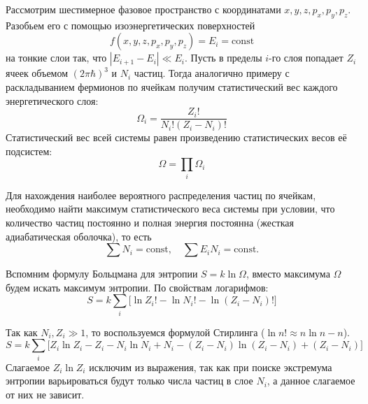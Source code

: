 Рассмотрим шестимерное фазовое пространство с координатами $x,y,z,p_x,p_y,p_z$. Разобьем его с помощью изоэнергетических поверхностей
\begin{equation*}
	f(x,y,z,p_x,p_y,p_z) = E_i = \mathrm{const}
\end{equation*}
на тонкие слои так, что $|E_{i+1}-E_{i}|\ll E_i$. Пусть в пределы $i$-го слоя попадает $Z_i$ ячеек объемом $(2\pi\hbar)^3$ и $N_i$ частиц. Тогда аналогично примеру с раскладыванием фермионов по ячейкам получим статистический вес каждого энергетического слоя:
\begin{equation*}
	\Omega_i = \frac{Z_i!}{N_i!(Z_i-N_i)!}
\end{equation*}
Статистический вес всей системы равен произведению статистических весов её подсистем:
\begin{equation*}
	\Omega = \prod_i \Omega_i
\end{equation*}

Для нахождения наиболее вероятного распределения частиц по ячейкам, необходимо найти максимум статистического веса системы при условии, что количество частиц постоянно и полная энергия постоянна (жесткая адиабатическая оболочка), то есть
\begin{equation*}
	\sum N_i=\mathrm{const},\quad \sum E_iN_i=\mathrm{const}.
\end{equation*}

Вспомним формулу Больцмана для энтропии $S=k\ln \Omega$, вместо максимума $\Omega$ будем искать максимум энтропии. По свойствам логарифмов:
\begin{equation*}
	S=k\sum_i \big[\ln Z_i! - \ln N_i ! - \ln(Z_i - N_i)!\big]
\end{equation*}

Так как $N_i, Z_i \gg 1$, то воспользуемся формулой Стирлинга ($\ln n! \approx n\ln n - n$).
\begin{equation*}
	S=k\sum_i \big[
	Z_i \ln Z_i - Z_i - N_i \ln N_i + N_i - (Z_i-N_i)\ln(Z_i-N_i) + (Z_i-N_i)
	\big]
\end{equation*}
Слагаемое $Z_i \ln Z_i$ исключим из выражения, так как при поиске экстремума энтропии варьироваться будут только числа частиц в слое $N_i$, а данное слагаемое от них не зависит.

